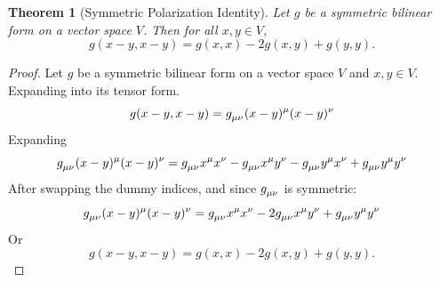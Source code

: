 \documentclass{amsart}
\newtheorem{theorem}{Theorem}[section]
\theoremstyle{definition}
\theoremstyle{remark}
\begin{document}
\begin{theorem}[Symmetric Polarization Identity]
  Let $g$ be a symmetric bilinear form on a vector space $V$. Then for all $x, y \in V$,
  \begin{equation*}
     g(x-y,x-y) = g(x,x)-2g(x,y)+g(y,y).
  \end{equation*}
\end{theorem}
\begin{proof}
  Let $g$ be a symmetric bilinear form on a vector space $V$ and $x, y \in V$. Expanding into its tensor form.
  \begin{equation*}
    g(x-y,x-y) = \tensor{g}{_\mu_\nu}\tensor{(x-y)}{^\mu}\tensor{(x-y)}{^\nu}
  \end{equation*}
  Expanding
  \begin{equation*}
    \tensor{g}{_\mu_\nu}\tensor{(x-y)}{^\mu}\tensor{(x-y)}{^\nu} =
    \tensor{g}{_\mu_\nu}\tensor{x}{^\mu}\tensor{x}{^\nu}-\tensor{g}{_\mu_\nu}\tensor{x}{^\mu}\tensor{y}{^\nu}-\tensor{g}{_\mu_\nu}\tensor{y}{^\mu}\tensor{x}{^\nu}+\tensor{g}{_\mu_\nu}\tensor{y}{^\mu}\tensor{y}{^\nu}
  \end{equation*}
  After swapping the dummy indices, and since $\tensor{g}{_\mu_\nu}$ is symmetric:
  \begin{equation*}
    \tensor{g}{_\mu_\nu}\tensor{(x-y)}{^\mu}\tensor{(x-y)}{^\nu} =
    \tensor{g}{_\mu_\nu}\tensor{x}{^\mu}\tensor{x}{^\nu}-2\tensor{g}{_\mu_\nu}\tensor{x}{^\mu}\tensor{y}{^\nu}+\tensor{g}{_\mu_\nu}\tensor{y}{^\mu}\tensor{y}{^\nu}
  \end{equation*}
  Or
  \begin{equation*}
    g(x-y,x-y) = g(x,x)-2g(x,y)+g(y,y).
  \end{equation*}
\end{proof}
\end{document}
